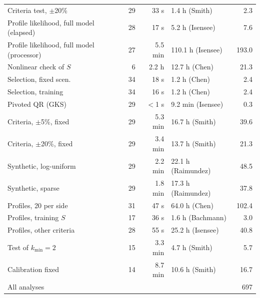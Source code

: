 \begin{longtable}{@{}lrrlr@{}}
Criteria test, $\pm$20\% & 29 & 33 s & 1.4 h (Smith) & 2.3 \\
Profile likelihood, full model (elapsed) & 28 & 17 s & 5.2 h (Isensee) & 7.6 \\
Profile likelihood, full model (processor) & 27 & 5.5 min & 110.1 h (Isensee) & 193.0 \\
Nonlinear check of $S$ & 6 & 2.2 h & 12.7 h (Chen) & 21.3 \\
Selection, fixed scen. & 34 & 18 s & 1.2 h (Chen) & 2.4 \\
Selection, training & 34 & 16 s & 1.2 h (Chen) & 2.4 \\
Pivoted QR (GKS) & 29 & $<$1 s & 9.2 min (Isensee) & 0.3 \\
Criteria, $\pm$5\%, fixed & 29 & 5.3 min & 16.7 h (Smith) & 39.6 \\
Criteria, $\pm$20\%, fixed & 29 & 3.4 min & 13.7 h (Smith) & 21.3 \\
Synthetic, log-uniform & 29 & 2.2 min & 22.1 h (Raimundez) & 48.5 \\
Synthetic, sparse & 29 & 1.8 min & 17.3 h (Raimundez) & 37.8 \\
Profiles, 20 per side & 31 & 47 s & 64.0 h (Chen) & 102.4 \\
Profiles, training $S$ & 17 & 36 s & 1.6 h (Bachmann) & 3.0 \\
Profiles, other criteria & 28 & 55 s & 25.2 h (Isensee) & 40.8 \\
Test of $k_{\min}=2$ & 15 & 3.3 min & 4.7 h (Smith) & 5.7 \\
Calibration fixed & 14 & 8.7 min & 10.6 h (Smith) & 16.7 \\
\midrule
All analyses & & & & 697 \\
\bottomrule
\end{longtable}
